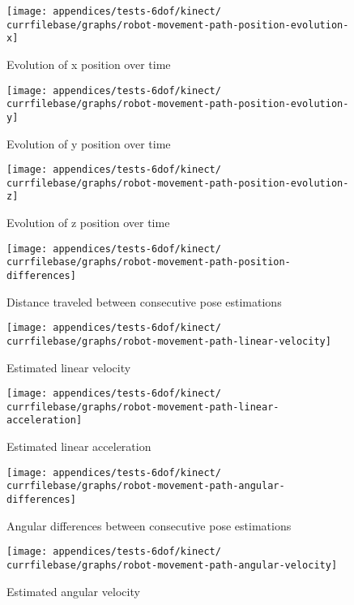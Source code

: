 \begin{figure}[H]
	\centering
	\texttt{[image: appendices/tests-6dof/kinect/\\currfilebase/graphs/robot-movement-path-position-evolution-x]}
	\caption{Evolution of x position over time}
\end{figure}

\begin{figure}[H]
	\centering
	\texttt{[image: appendices/tests-6dof/kinect/\\currfilebase/graphs/robot-movement-path-position-evolution-y]}
	\caption{Evolution of y position over time}
\end{figure}

\begin{figure}[H]
	\centering
	\texttt{[image: appendices/tests-6dof/kinect/\\currfilebase/graphs/robot-movement-path-position-evolution-z]}
	\caption{Evolution of z position over time}
\end{figure}


\begin{figure}[H]
	\centering
	\texttt{[image: appendices/tests-6dof/kinect/\\currfilebase/graphs/robot-movement-path-position-differences]}
	\caption{Distance traveled between consecutive pose estimations}
\end{figure}

\begin{figure}[H]
	\centering
	\texttt{[image: appendices/tests-6dof/kinect/\\currfilebase/graphs/robot-movement-path-linear-velocity]}
	\caption{Estimated linear velocity}
\end{figure}

\begin{figure}[H]
	\centering
	\texttt{[image: appendices/tests-6dof/kinect/\\currfilebase/graphs/robot-movement-path-linear-acceleration]}
	\caption{Estimated linear acceleration}
\end{figure}


\begin{figure}[H]
	\centering
	\texttt{[image: appendices/tests-6dof/kinect/\\currfilebase/graphs/robot-movement-path-angular-differences]}
	\caption{Angular differences between consecutive pose estimations}
\end{figure}

\begin{figure}[H]
	\centering
	\texttt{[image: appendices/tests-6dof/kinect/\\currfilebase/graphs/robot-movement-path-angular-velocity]}
	\caption{Estimated angular velocity}
\end{figure}

